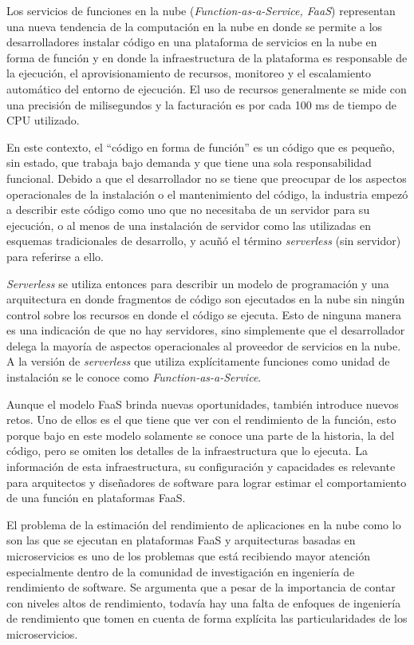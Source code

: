Los servicios de funciones en la nube (\textit{Function-as-a-Service, FaaS}) representan una nueva tendencia de la computación en la nube en donde se permite a los desarrolladores instalar código en  una plataforma de servicios en la nube en forma de función y en donde la infraestructura de la plataforma es responsable de la ejecución, el aprovisionamiento de recursos, monitoreo y el escalamiento automático del entorno de ejecución. El uso de recursos generalmente se mide con una precisión de milisegundos y la facturación es por cada 100 ms de tiempo de CPU utilizado. 

En este contexto, el ``código en forma de función'' es un código que es pequeño, sin estado, que trabaja bajo demanda y que tiene una sola responsabilidad funcional. Debido a que el desarrollador no se tiene que preocupar de los aspectos operacionales de la instalación o el mantenimiento del código, la industria empezó a describir este código como uno que no necesitaba de un servidor para su ejecución, o al menos de una instalación de servidor como las utilizadas en esquemas tradicionales de desarrollo, y acuñó el término \textit{serverless} (sin servidor) para referirse a ello. 

\textit{Serverless} se utiliza entonces para describir un modelo de programación y una arquitectura en donde fragmentos de código son ejecutados en la nube sin ningún control sobre los recursos en donde el código se ejecuta. Esto de ninguna manera es una indicación de que no hay servidores, sino simplemente que el desarrollador delega la mayoría de aspectos operacionales al proveedor de servicios en la nube. A la versión de \textit{serverless} que utiliza explícitamente funciones como unidad de instalación se le conoce como \textit{Function-as-a-Service}\cite{DBLP:journals/corr/BaldiniCCCFIMMR17}.

Aunque el modelo FaaS brinda nuevas oportunidades, también introduce nuevos retos. Uno de ellos es el que tiene que ver con el rendimiento de la función, esto porque bajo en este modelo solamente se conoce una parte de la historia, la del código, pero se omiten los detalles de la infraestructura que lo ejecuta. La información de esta infraestructura, su configuración y capacidades es relevante para arquitectos y diseñadores de software para lograr estimar el comportamiento de una función en plataformas FaaS. 

El problema de la estimación del rendimiento de aplicaciones en la nube como lo son las que se ejecutan en plataformas FaaS y arquitecturas basadas en microservicios es uno de los problemas que  está recibiendo mayor atención especialmente dentro de la comunidad de investigación en ingeniería de rendimiento de software. Se argumenta que a pesar de la importancia de contar con niveles altos de rendimiento, todavía hay una falta de enfoques de ingeniería de rendimiento que tomen en cuenta de forma explícita las particularidades de los microservicios\cite{Heinrich:2017:PEM:3053600.3053653}.

